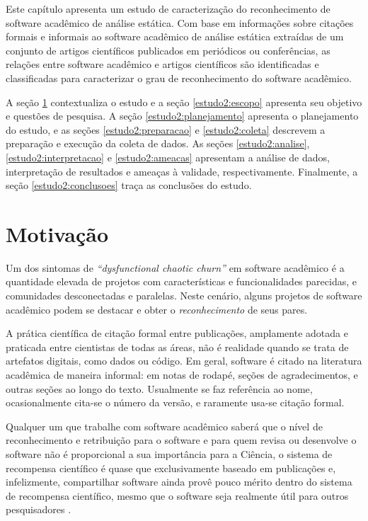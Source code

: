 {}\label{estudo2}

Este capítulo apresenta
um estudo de caracterização do reconhecimento de software acadêmico de análise estática.
Com base em informações sobre
citações formais e informais ao software acadêmico de análise estática
extraídas de um conjunto de artigos científicos publicados em periódicos ou conferências,
as relações entre software acadêmico e artigos científicos
são identificadas e classificadas %
para caracterizar o grau de reconhecimento do software acadêmico.

A seção \ref{estudo2:introducao} contextualiza o estudo
e a seção \ref{estudo2:escopo} apresenta seu objetivo e questões de pesquisa.
A seção \ref{estudo2:planejamento} apresenta o planejamento do estudo, e
as seções \ref{estudo2:preparacao} e \ref{estudo2:coleta} descrevem a preparação e execução da coleta de dados.
As seções \ref{estudo2:analise}, \ref{estudo2:interpretacao} e \ref{estudo2:ameacas}
apresentam a análise de dados, interpretação de resultados e ameaças à validade, respectivamente.
Finalmente, a seção \ref{estudo2:conclusoes} traça as conclusões do estudo.

\section{Motivação} \label{estudo2:introducao} %

Um dos sintomas de 
{\it ``dysfunctional chaotic churn''} \cite{howison2015understanding}
em software acadêmico é a quantidade elevada de projetos 
com características e funcionalidades parecidas, 
e comunidades desconectadas e paralelas.
Neste cenário, alguns projetos de software acadêmico
podem se destacar e obter o \textit{reconhecimento} de seus pares.

A prática científica de citação formal entre publicações, amplamente
adotada e praticada entre cientistas de todas as áreas, não é realidade quando
se trata de artefatos digitais, como dados ou código.
Em geral, software é citado na literatura acadêmica %
de maneira informal: em notas de rodapé, seções de agradecimentos, e outras
seções ao longo do texto. Usualmente se faz referência ao nome, ocasionalmente
cita-se o número da versão, e raramente usa-se citação formal.

Qualquer um que trabalhe com software acadêmico saberá que o nível de
reconhecimento e retribuição para o software e para quem revisa ou desenvolve o
software não é proporcional a sua importância para a Ciência, o sistema de
recompensa científico é quase que exclusivamente baseado em publicações e,
infelizmente, compartilhar software ainda provê pouco mérito dentro do sistema
de recompensa científico, mesmo que o software seja realmente útil para outros
pesquisadores \cite{goble2014better}.

